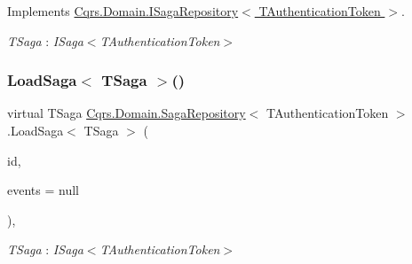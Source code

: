 Implements \hyperlink{interfaceCqrs_1_1Domain_1_1ISagaRepository_aa3409bf59bbe489afcc89716928e9ad1_aa3409bf59bbe489afcc89716928e9ad1}{Cqrs.\+Domain.\+I\+Saga\+Repository$<$ T\+Authentication\+Token $>$}.

\begin{Desc}
\item[Type Constraints]\begin{description}
\item[{\em T\+Saga} : {\em I\+Saga$<$T\+Authentication\+Token$>$}]\end{description}
\end{Desc}
\mbox{\label{classCqrs_1_1Domain_1_1SagaRepository_acc59a4478bb992b03690f0cda3e4e362_acc59a4478bb992b03690f0cda3e4e362}} 
\subsubsection{\texorpdfstring{Load\+Saga$<$ T\+Saga $>$()}{LoadSaga< TSaga >()}}
{\footnotesize\ttfamily virtual T\+Saga \hyperlink{classCqrs_1_1Domain_1_1SagaRepository}{Cqrs.\+Domain.\+Saga\+Repository}$<$ T\+Authentication\+Token $>$.Load\+Saga$<$ T\+Saga $>$ (\begin{DoxyParamCaption}\item[{Guid}]{id,  }\item[{I\+List$<$ \hyperlink{interfaceCqrs_1_1Events_1_1ISagaEvent}{I\+Saga\+Event}$<$ T\+Authentication\+Token $>$$>$}]{events = {\ttfamily null} }\end{DoxyParamCaption})\hspace{0.3cm}{\ttfamily [protected]}, {\ttfamily [virtual]}}

\begin{Desc}
\item[Type Constraints]\begin{description}
\item[{\em T\+Saga} : {\em I\+Saga$<$T\+Authentication\+Token$>$}]\end{description}
\end{Desc}
\mbox{\label{classCqrs_1_1Domain_1_1SagaRepository_af6af9066681e47bc4ff2e14358321fb8_af6af9066681e47bc4ff2e14358321fb8}} 
